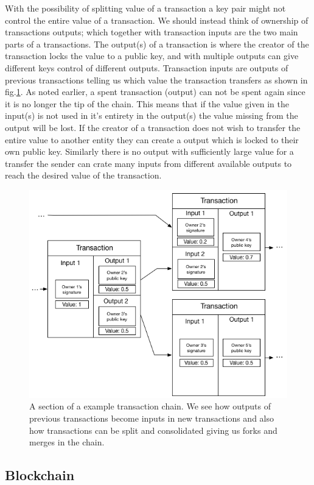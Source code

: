 With the possibility of splitting value of a transaction a key pair might not control the entire value of a transaction. We should instead think of ownership of transactions outputs; which together with transaction inputs are the two main parts of a transactions. The output(s) of a transaction is where the creator of the transaction locks the value to a public key, and with multiple outputs can give different keys control of different outputs. Transaction inputs are outputs of previous transactions telling us which value the transaction transfers as shown in fig.\ref{fig:transaction}. As noted earlier, a spent transaction (output) can not be spent again since it is no longer the tip of the chain. This means that if the value given in the input(s) is not used in it's entirety in the output(s) the value missing from the output will be lost. If the creator of a transaction does not wish to transfer the entire value to another entity they can create a output which is locked to their own public key. Similarly there is no output with sufficiently large value for a transfer the sender can crate many inputs from different available outputs to reach the desired value of the transaction. 

\begin{figure}[h]  %
  \centering
  \includegraphics[width=.7\textwidth]{figures/transaction}
  \caption[Transaction chain]{A section of a example transaction chain. We see how outputs of previous transactions become inputs in new transactions and also how transactions can be split and consolidated giving us forks and merges in the chain.}
  \label{fig:transaction}
\end{figure}


\subsection{Blockchain}

